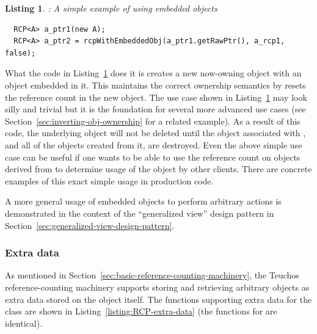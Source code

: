 \documentclass[pdf,ps2pdf,11pt]{SANDreport}
\newtheorem{listing}{Listing}
\begin{document}
{}\begin{listing}: A simple example of using embedded objects
\label{listsing:embedded-obj-simple-rcp-clone}
{\small\begin{verbatim}
  RCP<A> a_ptr1(new A);
  RCP<A> a_ptr2 = rcpWithEmbeddedObj(a_ptr1.getRawPtr(), a_rcp1, false);
\end{verbatim}}
\end{listing}


What the code in Listing~\ref{listsing:embedded-obj-simple-rcp-clone}
does it is creates a new now-owning {} object with an
{} object embedded in it.  This maintains the correct
ownership semantics by resets the reference count in the new
{} object.  The use case shown in
Listing~\ref{listsing:embedded-obj-simple-rcp-clone} may look silly
and trivial but it is the foundation for several more advanced use
cases (see Section~\ref{sec:inverting-obj-ownership} for a related
example).  As a result of this code, the underlying {} object
will not be deleted until the {} object associated
with {}, and all of the {} objects created from
it, are destroyed.  Even the above simple use case can be useful if
one wants to be able to use the reference count on {} objects
derived from {} to determine usage of the object by other
clients.  There are concrete examples of this exact simple usage in
production code.

A more general usage of embedded objects to perform arbitrary actions
is demonstrated in the context of the ``generalized view'' design
pattern in Section~\ref{sec:generalized-view-design-pattern}.


%
{}\subsubsection{Extra data}
\label{sec:extra-data}
%

As mentioned in Section~\ref{sec:basic-reference-counting-machinery},
the Teuchos reference-counting machinery supports storing and
retrieving arbitrary objects as extra data stored on the
{} object itself.  The functions supporting extra data
for the {} class are shown in
Listing~\ref{listing:RCP-extra-data} (the functions for
{} are identical).
\end{document}
